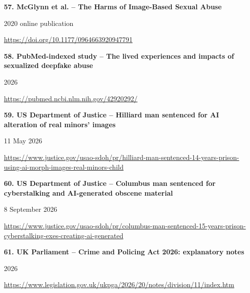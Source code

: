 \documentclass[11pt,a4paper]{article}
\begin{document}
\noindent\begin{minipage}{\linewidth}\textbf{57. McGlynn et al. -- The Harms of Image-Based Sexual Abuse}\par{\small 2020 online publication\par\url{https://doi.org/10.1177/0964663920947791}}\par
\end{minipage}\par\vspace{2mm}
\noindent\begin{minipage}{\linewidth}\textbf{58. PubMed-indexed study -- The lived experiences and impacts of sexualized deepfake abuse}\par{\small 2026\par\url{https://pubmed.ncbi.nlm.nih.gov/42920292/}}\par
\end{minipage}\par\vspace{2mm}
\noindent\begin{minipage}{\linewidth}\textbf{59. US Department of Justice -- Hilliard man sentenced for AI alteration of real minors' images}\par{\small 11 May 2026\par\url{https://www.justice.gov/usao-sdoh/pr/hilliard-man-sentenced-14-years-prison-using-ai-morph-images-real-minors-child}}\par
\end{minipage}\par\vspace{2mm}
\noindent\begin{minipage}{\linewidth}\textbf{60. US Department of Justice -- Columbus man sentenced for cyberstalking and AI-generated obscene material}\par{\small 8 September 2026\par\url{https://www.justice.gov/usao-sdoh/pr/columbus-man-sentenced-15-years-prison-cyberstalking-exes-creating-ai-generated}}\par
\end{minipage}\par\vspace{2mm}
\noindent\begin{minipage}{\linewidth}\textbf{61. UK Parliament -- Crime and Policing Act 2026: explanatory notes}\par{\small 2026\par\url{https://www.legislation.gov.uk/ukpga/2026/20/notes/division/11/index.htm}}\par
\end{minipage}\par\vspace{2mm}
\end{document}

